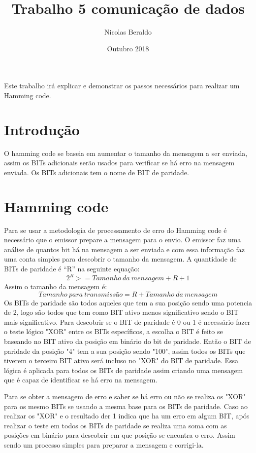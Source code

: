 \documentclass{article}
\title{Trabalho 5 comunicação de dados}
\author{Nicolas Beraldo}
\date{Outubro 2018}
\begin{document}
    \maketitle
        \begin{center}
            Este trabalho irá explicar e demonstrar os passos necessários para realizar um Hamming code.
        \end{center}
    \section*{Introdução}
        O hamming code se baseia em aumentar o tamanho da mensagem a ser enviada, assim os BITs adicionais serão usados para verificar se há erro na mensagem enviada. Os BITs adicionais tem o nome de BIT de paridade.
    \section{Hamming code}
        Para se usar a metodologia de processamento de erro do Hamming code é necessário que o emissor prepare a mensagem para o envio. O emissor faz uma análise de quantos bit há na mensagem a ser enviada e com essa informação faz uma conta simples para descobrir o tamanho da mensagem. A quantidade de BITs de paridade é “R” na seguinte equação:
        \[ 2^R >= Tamanho\ da\ mensagem + R + 1 \]
        Assim o tamanho da mensagem é:
        \[ Tamanho\ para\ transmissão = R + Tamanho\ da\ mensagem\]
        Os BITs de paridade são todos aqueles que tem a sua posição sendo uma potencia de 2, logo são todos que tem como BIT ativo menos significativo sendo o BIT mais significativo. Para descobrir se o BIT de paridade é 0 ou 1 é necessário fazer o teste lógico "XOR" entre os BITs específicos, a escolha o BIT é feito se baseando no BIT ativo da posição em binário do bit de paridade. Então o BIT de paridade da posição "4" tem a sua posição sendo "100", assim todos os BITs que tiverem o terceiro BIT ativo será incluso no "XOR" do BIT de paridade. Essa lógica é aplicada para todos os BITs de paridade assim criando uma mensagem que é capaz de identificar se há erro na mensagem.
        
        Para se obter a mensagem de erro e saber se há erro ou não se realiza os "XOR" para os mesmo BITs se usando a mesma base para os BITs de paridade. Caso ao realizar os "XOR" e o resultado der 1 indica que ha um erro em algum BIT, após realizar o teste em todos os BITs de paridade se realiza uma soma com as posições em binário para descobrir em que posição se encontra o erro. Assim sendo um processo simples para preparar a mensagem e corrigi-la.
\end{document}
